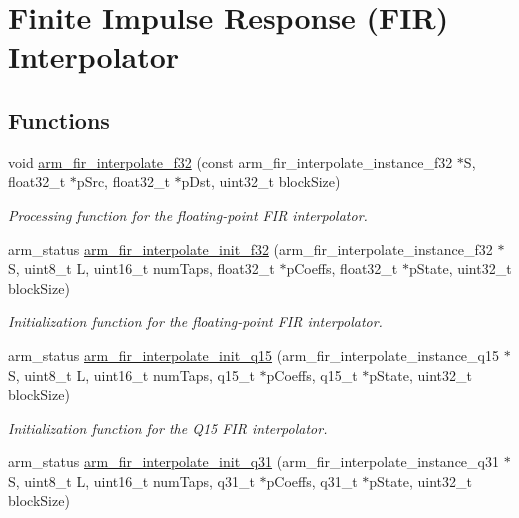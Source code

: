 \hypertarget{group__FIR__Interpolate}{}\section{Finite Impulse Response (F\+IR) Interpolator}
\label{group__FIR__Interpolate}
\subsection*{Functions}
\begin{DoxyCompactItemize}
\item 
void \hyperlink{group__FIR__Interpolate_ga9cae104c5cf60b4e7671c82264a8c12e}{arm\+\_\+fir\+\_\+interpolate\+\_\+f32} (const arm\+\_\+fir\+\_\+interpolate\+\_\+instance\+\_\+f32 $\ast$S, float32\+\_\+t $\ast$p\+Src, float32\+\_\+t $\ast$p\+Dst, uint32\+\_\+t block\+Size)
\begin{DoxyCompactList}\small\item\em Processing function for the floating-\/point F\+IR interpolator. \end{DoxyCompactList}\item 
arm\+\_\+status \hyperlink{group__FIR__Interpolate_ga0f857457a815946f7e4dca989ebf6ff6}{arm\+\_\+fir\+\_\+interpolate\+\_\+init\+\_\+f32} (arm\+\_\+fir\+\_\+interpolate\+\_\+instance\+\_\+f32 $\ast$S, uint8\+\_\+t L, uint16\+\_\+t num\+Taps, float32\+\_\+t $\ast$p\+Coeffs, float32\+\_\+t $\ast$p\+State, uint32\+\_\+t block\+Size)
\begin{DoxyCompactList}\small\item\em Initialization function for the floating-\/point F\+IR interpolator. \end{DoxyCompactList}\item 
arm\+\_\+status \hyperlink{group__FIR__Interpolate_ga18e8c4a74ff1d0f88876cc63f675288f}{arm\+\_\+fir\+\_\+interpolate\+\_\+init\+\_\+q15} (arm\+\_\+fir\+\_\+interpolate\+\_\+instance\+\_\+q15 $\ast$S, uint8\+\_\+t L, uint16\+\_\+t num\+Taps, q15\+\_\+t $\ast$p\+Coeffs, q15\+\_\+t $\ast$p\+State, uint32\+\_\+t block\+Size)
\begin{DoxyCompactList}\small\item\em Initialization function for the Q15 F\+IR interpolator. \end{DoxyCompactList}\item 
arm\+\_\+status \hyperlink{group__FIR__Interpolate_ga9d0ba38ce9f12a850dd242731d307476}{arm\+\_\+fir\+\_\+interpolate\+\_\+init\+\_\+q31} (arm\+\_\+fir\+\_\+interpolate\+\_\+instance\+\_\+q31 $\ast$S, uint8\+\_\+t L, uint16\+\_\+t num\+Taps, q31\+\_\+t $\ast$p\+Coeffs, q31\+\_\+t $\ast$p\+State, uint32\+\_\+t block\+Size)

\end{DoxyCompactItemize}
